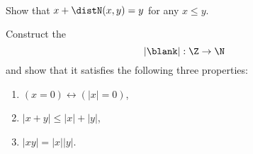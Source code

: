 \begin{exercises}
\begin{subexenum}
\begin{align*}
    \end{align*}
  \item Show that $x+\distN(x,y)=y$ for any $x\leq y$. 
  \end{subexenum}
  \exitem Construct the 
  \begin{equation*}
    |\blank|:\Z\to\N
  \end{equation*}
  and show that it satisfies the following three properties:
  \begin{enumerate}
  \item $(x=0)\leftrightarrow (|x|=0)$,
  \item $|x+y|\leq |x|+|y|$,
  \item $|xy|=|x||y|$.
  \end{enumerate}
\end{exercises}



